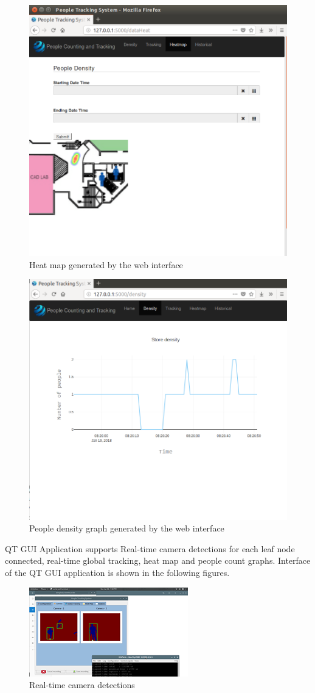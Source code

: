 \documentclass[12pt,a4paper]{report}
\begin{document}
\begin{figure}[H]
  \centering
  \includegraphics[width=.6\linewidth]{heatmap}
  \caption{Heat map generated by the web interface}
  \label{graph1}
\end{figure}
\begin{figure}[H]
  \centering
  \includegraphics[width=.6\linewidth]{density}
  \caption{People density graph generated by the web interface}
  \label{graph2}
\end{figure}
\newpage

QT GUI Application supports Real-time camera detections for each leaf node connected, real-time global tracking, heat map and people count graphs. Interface of the QT GUI application is shown in the following figures.
\begin{figure}[H]
  \centering
  \includegraphics[width=\textwidth]{qt_cam.png}
  \caption{Real-time camera detections}
  \label{qt_graph1}
\end{figure}
\end{document}
